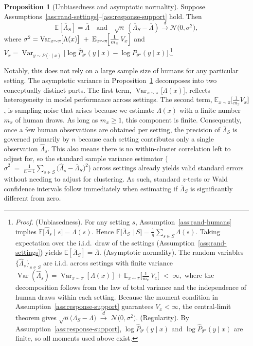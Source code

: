 \documentclass[11pt]{article}
\theoremstyle{definition}
\newtheorem{proposition}{Proposition}
\begin{document}
\begin{proposition}[Unbiasedness and asymptotic normality]
\label{prop:sample-valid}
Suppose Assumptions~\ref{ass:rand-settings}--\ref{ass:response-support} hold.
Then
\[
\mathbb{E}[\bar{\Lambda}_{S}] = \bar{\Lambda}
\quad \text{and} \quad
\sqrt{n}\,(\bar{\Lambda}_{S}-\bar{\Lambda})
\xrightarrow{d} \mathcal{N}\bigl(0,\sigma^{2}\bigr),
\]
where $
\sigma^{2}
= \operatorname{Var}_{x\sim\pi}\!\bigl[\Lambda(x)\bigr]
\;+\;
\mathbb{E}_{x\sim\pi}\!\Bigl[\tfrac{1}{m_x}\,V_x\Bigr]$ and 
$V_x
= \operatorname{Var}_{y \sim P(\cdot \mid x)}
\bigl[\log\hat P_{\theta'}(y \mid x)
-\log\hat P_{\theta''}( y\mid x)\bigr].$\footnote{\emph{Proof.} (Unbiasedness).
For any setting $s$, Assumption~\ref{ass:rand-humans} implies $\mathbb{E}\bigl[\hat\Lambda_s \mid s\bigr]=\Lambda(s).$
Hence $\mathbb{E}\bigl[\bar\Lambda_S \mid S\bigr] = \frac{1}{n}\sum_{s \in S}\Lambda(s).$
Taking expectation over the i.i.d.\ draw of the settings (Assumption~\ref{ass:rand-settings}) yields $\mathbb{E}[\bar\Lambda_S]=\bar\Lambda.$
(Asymptotic normality).
The random variables $\{\hat\Lambda_s\}_{s \in S}$ are i.i.d. across settings with finite variance $
\operatorname{Var}(\hat\Lambda_s)
= \operatorname{Var}_{x\sim\pi}[\Lambda(x)]
+ \mathbb{E}_{x\sim\pi}
\bigl[{\textstyle\frac{1}{m_x}}\,V_x\bigr]
\;<\;\infty,$
where the decomposition follows from the law of total variance and the independence of human draws within each setting.
Because the moment condition in Assumption~\ref{ass:response-support} guarantees $V_x<\infty$, the central-limit theorem gives $\sqrt{n}\bigl(\bar\Lambda_S-\bar\Lambda\bigr)
\;\xrightarrow{d}\;
\mathcal N\bigl(0,\sigma^{2}\bigr).$
(Regularity).
By Assumption~\ref{ass:response-support},
$\log\hat P_{\theta'}(y\mid x)$ and $\log\hat P_{\theta''}(y\mid x)$ are finite, so all moments used above exist.}
\end{proposition}

Notably, this does not rely on a large sample size of humans for any particular setting.
The asymptotic variance in Proposition~\ref{prop:sample-valid} decomposes into two conceptually distinct parts.
The first term, $\operatorname{Var}_{x\sim\pi}\bigl[\Lambda(x)\bigr]$, reflects heterogeneity in model performance across settings.
The second term, $\mathbb{E}_{x\sim\pi}\bigl[\frac{1}{m_x}V_x\bigr]$, is sampling noise that arises because we estimate $\Lambda(x)$ with a finite number $m_x$ of human draws. 
As long as $m_x\ge 1$, this component is finite. 
Consequently, once a few human observations are obtained per setting, the precision of $\bar\Lambda_S$ is governed primarily by $n$ 
because each setting contributes only a single observation $\hat\Lambda_s$.
This also means there is no within-cluster correlation left to adjust for, so the standard sample variance estimator ($\hat{\sigma}^{2}\;=\;\frac{1}{n-1}\sum_{s\in S}\!\bigl(\hat{\Lambda}_{s}-\bar{\Lambda}_{S}\bigr)^{2}$) across settings already yields valid standard errors without needing to adjust for clustering.
As such, standard $z$-tests or Wald confidence intervals follow immediately when estimating if $\bar\Lambda_S$ is significantly different from zero.
\end{document}
